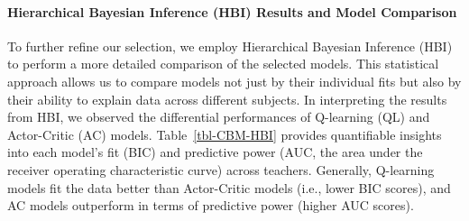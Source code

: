 \documentclass[
  number,
  preprint,
  3p,
  onecolumn]{elsarticle}
\let\oldparagraph\paragraph
\renewcommand{\paragraph}[1]{\oldparagraph{#1}\mbox{}}
\begin{document}
\paragraph{Hierarchical Bayesian Inference (HBI) Results and Model
Comparison}\label{hierarchical-bayesian-inference-hbi-results-and-model-comparison}

To further refine our selection, we employ Hierarchical Bayesian
Inference (HBI) to perform a more detailed comparison of the selected
models. This statistical approach allows us to compare models not just
by their individual fits but also by their ability to explain data
across different subjects. In interpreting the results from HBI, we
observed the differential performances of Q-learning (QL) and
Actor-Critic (AC) models. Table~\ref{tbl-CBM-HBI} provides quantifiable
insights into each model's fit (BIC) and predictive power (AUC, the area
under the receiver operating characteristic curve) across teachers.
Generally, Q-learning models fit the data better than Actor-Critic
models (i.e., lower BIC scores), and AC models outperform in terms of
predictive power (higher AUC scores).
\end{document}
